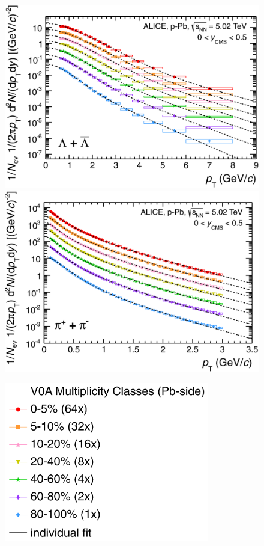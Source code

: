 \begin{figure}[ht]
    \centering
    \begin{minipage}{0.48\textwidth}
        \includegraphics[width=\textwidth]{figures/analysis/lambda_pt_spectra.png}
        \includegraphics[width=\textwidth]{figures/analysis/pion_pt_spectra.png}
    \end{minipage}
    \hspace{1.2cm}
    \begin{minipage}{0.40\textwidth}
        \includegraphics[width=0.8\textwidth]{figures/analysis/pt_spectra_legend.png}

\end{minipage}
\end{figure}
